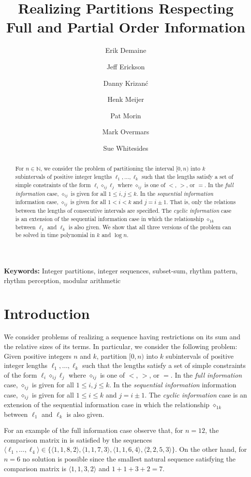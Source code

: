 \documentclass[11pt,a4paper]{article}
\title{Realizing Partitions Respecting Full
and Partial Order Information}
\author{
	Erik Demaine \and
	Jeff Erickson \and
	Danny Krizan\'c \and
	Henk Meijer \and
	Pat Morin \and
	Mark Overmars \and
	Sue Whitesides
}
\date{}
\newcommand{\N}{\mathbb{N}}
\newcommand{\op}{\diamond}
\newcommand{\opij}{\op_{ij}}
\begin{document}
\maketitle
\thispagestyle{empty}

\begin{abstract} 
For $n\in\N$, we consider the problem of partitioning the interval
$[0,n)$ into $k$ subintervals of positive integer lengths
$\ell_1,\ldots,\ell_k$ such that the lengths satisfy a set of simple
constraints of the form $\ell_i \opij \ell_j$ where $\opij$ is one of
$<$, $>$, or $=$.  In the \emph{full information} case, $\opij$ is
given for all $1\le i,j\le k$.  In the \emph{sequential information}
information case, $\opij$ is given for all $1< i< k$ and $j=i\pm 1$.
That is, only the relations between the lengths of consecutive
intervals are specified.  The \emph{cyclic information} case is an
extension of the sequential information case in which the 
relationship $\op_{1k}$ between $\ell_1$ and $\ell_k$ is also given.
We show that all three versions of the problem can be solved in time
polynomial in $k$ and $\log n$.
\end{abstract}

\noindent\textbf{Keywords:} Integer partitions, integer sequences,
subset-sum, rhythm pattern, rhythm perception, modular arithmetic

\section{Introduction}
We consider problems of realizing a sequence having restrictions on
its sum and the relative sizes of its terms.  In particular, we
consider the following problem:  Given positive integers $n$ and $k$,
partition $[0,n)$ into $k$ subintervals of positive integer lengths
$\ell_1,\ldots,\ell_k$ such that the lengths satisfy a set of simple
constraints of the form $\ell_i \opij \ell_j$ where $\opij$ is one of
$<$, $>$, or $=$.  In the \emph{full information} case, $\opij$ is
given for all $1\le i,j\le k$.  In the \emph{sequential information}
information case, $\opij$ is given for all $1\le i\le k$ and $j=i\pm
1$.  The \emph{cyclic information} case is an extension of the
sequential information case in which the relationship $\op_{1k}$
between $\ell_1$ and $\ell_k$ is also given. 

For an example of the full information case observe that, for $n=12$,
the comparison matrix in  is satisfied by the
sequences $\langle\ell_1,\ldots,\ell_4\rangle\in
\{\langle1,1,8,2\rangle, \langle1,1,7,3\rangle, \langle1,1,6,4\rangle,
\langle2,2,5,3\rangle\}$.  On the other hand, for $n=6$ no solution is
possible since the smallest natural sequence satisfying the comparison
matrix is $\langle1,1,3,2\rangle$ and $1+1+3+2=7$.
\end{document}
